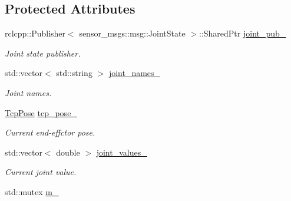 \subsection*{Protected Attributes}
\begin{DoxyCompactItemize}
\item 
\mbox{\label{classArmControlBase_ad73e15cce746d086b3f526d814362337}} 
rclcpp\+::\+Publisher$<$ sensor\+\_\+msgs\+::msg\+::\+Joint\+State $>$\+::Shared\+Ptr \hyperlink{classArmControlBase_ad73e15cce746d086b3f526d814362337}{joint\+\_\+pub\+\_\+}
\begin{DoxyCompactList}\small\item\em Joint state publisher. \end{DoxyCompactList}\item 
\mbox{\label{classArmControlBase_ac8778720f435d3cdd44b7efb6dd76b3b}} 
std\+::vector$<$ std\+::string $>$ \hyperlink{classArmControlBase_ac8778720f435d3cdd44b7efb6dd76b3b}{joint\+\_\+names\+\_\+}
\begin{DoxyCompactList}\small\item\em Joint names. \end{DoxyCompactList}\item 
\mbox{\label{classArmControlBase_a2d6a98c9218fc0056303a3a544e4fe37}} 
\hyperlink{structTcpPose}{Tcp\+Pose} \hyperlink{classArmControlBase_a2d6a98c9218fc0056303a3a544e4fe37}{tcp\+\_\+pose\+\_\+}
\begin{DoxyCompactList}\small\item\em Current end-\/effctor pose. \end{DoxyCompactList}\item 
\mbox{\label{classArmControlBase_a6262c793e6c778a9ad71037918d57f41}} 
std\+::vector$<$ double $>$ \hyperlink{classArmControlBase_a6262c793e6c778a9ad71037918d57f41}{joint\+\_\+values\+\_\+}
\begin{DoxyCompactList}\small\item\em Current joint value. \end{DoxyCompactList}\item 
\mbox{\label{classArmControlBase_a1965ad8ee920b1ffc9d1bddbbf053edd}} 
std\+::mutex \hyperlink{classArmControlBase_a1965ad8ee920b1ffc9d1bddbbf053edd}{m\+\_\+}

\end{DoxyCompactItemize}
